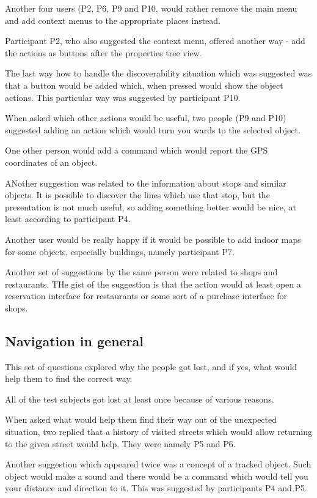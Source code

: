 \documentclass[nolof,digital]{fithesis3}
\begin{document}
Another four users (P2, P6, P9 and P10, would rather remove the main menu and add context menus to the appropriate places instead.

Participant P2, who also suggested the context menu, offered another way - add the actions as buttons after the properties tree view.

The last way how to handle the discoverability situation which was suggested was that a button would be added which, when pressed would show the object actions. This particular way was suggested by participant P10.

When asked which other actions would be useful, two people (P9 and P10) suggested adding an action which would turn you wards to the selected object.

One other person would add a command which would report the GPS coordinates of an object.

ANother suggestion was related to the information about stops and similar objects. It is possible to discover the lines which use that stop, but the presentation is not much useful, so adding something better would be nice, at least according to participant P4.

Another user would be really happy if it would be possible to add indoor maps for some objects, especially buildings, namely participant P7.

Another  set of suggestions by the same person were related to shops and restaurants. THe gist of the suggestion is that the action would at least open a reservation interface for restaurants or some sort of a purchase interface for shops.
\subsection{Navigation in general}
This set of questions explored why the people got lost, and if yes, what would help them to find the correct way.

All of the test subjects got lost at least once because of various reasons.

When asked what would help them find their way out of the unexpected situation, two replied that a history of visited streets which would allow returning to the given street would help. They were namely P5 and P6.

Another suggestion which appeared twice was a concept of a tracked object. Such object would make a sound and there would be a command which would tell you your distance and direction to it. This was suggested by participants P4 and P5.
\end{document}
